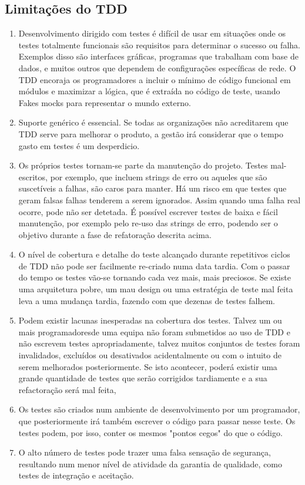 \subsection{Limitações do TDD}

\begin{enumerate}
    \item Desenvolvimento dirigido com testes é difícil de usar em situações onde os testes totalmente funcionais são requisitos para determinar o sucesso ou falha. Exemplos disso são interfaces gráficas, programas que trabalham com base de dados, e muitos outros que dependem de configurações específicas de rede. O TDD encoraja os programadores a incluir o mínimo de código funcional em módulos e maximizar a lógica, que é extraída no código de teste, usando Fakes mocks para representar o mundo externo.
    \item Suporte genérico é essencial. Se todas as organizações não acreditarem que TDD serve para melhorar o produto, a gestão irá considerar que o tempo gasto em testes é um desperdicio.
    \item Os próprios testes tornam-se parte da manutenção do projeto. Testes mal-escritos, por exemplo, que incluem strings de erro ou aqueles que são suscetíveis a falhas, são caros para manter. Há um risco em que testes que geram falsas falhas tenderem a serem ignorados. Assim quando uma falha real ocorre, pode não ser detetada. É possível escrever testes de baixa e fácil manutenção, por exemplo pelo re-uso das strings de erro, podendo ser o objetivo durante a fase de refatoração descrita acima.
    \item O nível de cobertura e detalhe do teste alcançado durante repetitivos ciclos de TDD não pode ser facilmente re-criado numa data tardia. Com o passar do tempo os testes vão-se tornando cada vez mais, mais preciosos. Se existe uma arquitetura pobre, um mau design ou uma estratégia de teste mal feita leva a uma mudança tardia, fazendo com que dezenas de testes falhem.
    \item Podem existir lacunas inesperadas na cobertura dos testes. Talvez um ou mais programadoresde uma equipa não foram submetidos ao uso de TDD e não escrevem testes apropriadamente, talvez muitos conjuntos de testes foram invalidados, excluídos ou desativados acidentalmente ou com o intuito de serem melhorados posteriormente. Se isto acontecer, poderá existir uma grande quantidade de testes que serão corrigidos tardiamente e a sua refactoração será mal feita, 
    \item Os testes são criados num ambiente de desenvolvimento por um programador, que posteriormente irá também escrever o código para passar nesse teste. Os testes podem, por isso, conter os mesmos "pontos cegos" do que o código. 
    \item O alto número de testes pode trazer uma falsa sensação de segurança, resultando num menor nível de atividade da garantia de qualidade, como testes de integração e aceitação.
\end{enumerate}